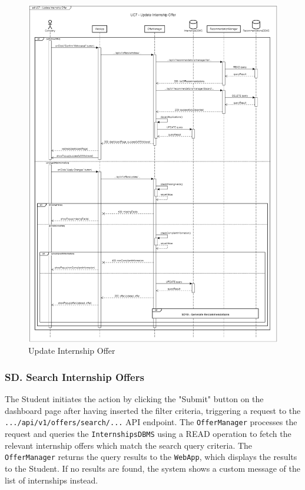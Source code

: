 \newpage

\begin{figure}[H]
    \begin{center}
         \includegraphics[width=1\linewidth]{LaTeXCode/images/SequenceDiagrams/UC7-sequenceDiagram.png}
         \caption{Update Internship Offer}
         \label{fig:update_internship_offer_sd}
     \end{center}
\end{figure}

\subsubsection*{SD\cuc. Search Internship Offers}
\label{subsubsec:search_offer_sd}
The Student initiates the action by clicking the "Submit" button on the dashboard page after having inserted the filter criteria, triggering a request to the \texttt{.../api/v1/offers/search/...} API endpoint. The \texttt{OfferManager} processes the request and queries the \texttt{InternshipsDBMS} using a READ operation to fetch the relevant internship offers which match the search query criteria.
The \texttt{OfferManager} returns the query results to the \texttt{WebApp}, which displays the results to the Student. If no results are found, the system shows a custom message of the list of internships instead.

